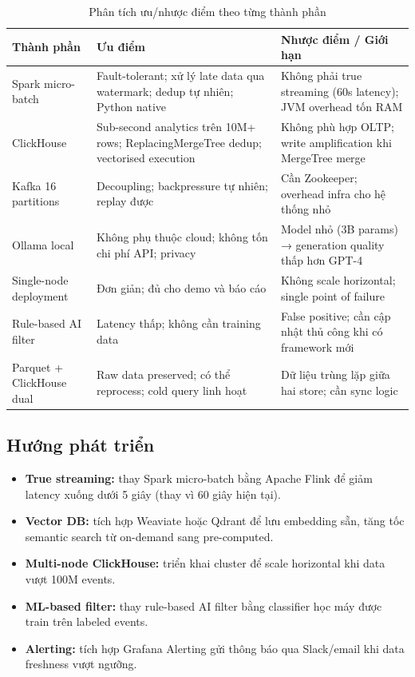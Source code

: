 \documentclass[12pt,a4paper]{article}
\newcommand{\kw}[1]{\textbf{#1}}
\begin{document}
\begin{table}[H]
  \centering
  \caption{Phân tích ưu/nhược điểm theo từng thành phần}
  \begin{tabularx}{\linewidth}{p{3cm}Xp{4cm}}
    \toprule
    \textbf{Thành phần} & \textbf{Ưu điểm} & \textbf{Nhược điểm / Giới hạn} \\
    \midrule
    Spark micro-batch
      & Fault-tolerant; xử lý late data qua watermark; dedup tự nhiên; Python native
      & Không phải true streaming (60s latency); JVM overhead tốn RAM \\
    ClickHouse
      & Sub-second analytics trên 10M+ rows; ReplacingMergeTree dedup; vectorised execution
      & Không phù hợp OLTP; write amplification khi MergeTree merge \\
    Kafka 16 partitions
      & Decoupling; backpressure tự nhiên; replay được
      & Cần Zookeeper; overhead infra cho hệ thống nhỏ \\
    Ollama local
      & Không phụ thuộc cloud; không tốn chi phí API; privacy
      & Model nhỏ (3B params) → generation quality thấp hơn GPT-4 \\
    Single-node deployment
      & Đơn giản; đủ cho demo và báo cáo
      & Không scale horizontal; single point of failure \\
    Rule-based AI filter
      & Latency thấp; không cần training data
      & False positive; cần cập nhật thủ công khi có framework mới \\
    Parquet + ClickHouse dual
      & Raw data preserved; có thể reprocess; cold query linh hoạt
      & Dữ liệu trùng lặp giữa hai store; cần sync logic \\
    \bottomrule
  \end{tabularx}
\end{table}

\subsection{Hướng phát triển}

\begin{itemize}[leftmargin=1.5em]
  \item \kw{True streaming:} thay Spark micro-batch bằng Apache Flink
        để giảm latency xuống dưới 5 giây (thay vì 60 giây hiện tại).
  \item \kw{Vector DB:} tích hợp Weaviate hoặc Qdrant để lưu
        embedding sẵn, tăng tốc semantic search từ on-demand sang pre-computed.
  \item \kw{Multi-node ClickHouse:} triển khai cluster để scale
        horizontal khi data vượt 100M events.
  \item \kw{ML-based filter:} thay rule-based AI filter bằng
        classifier học máy được train trên labeled events.
  \item \kw{Alerting:} tích hợp Grafana Alerting gửi thông báo
        qua Slack/email khi data freshness vượt ngưỡng.
\end{itemize}
\end{document}
